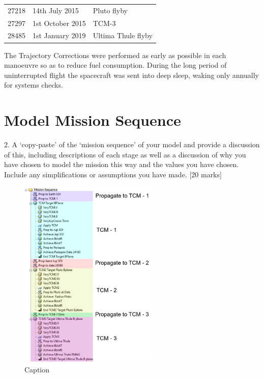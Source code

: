 \documentclass[11pt]{article}
\begin{document}
\begin{table}[H]
\begin{tabular}{@{}cll@{}}
\rowcolor[HTML]{FFD8AD} 
27218                                                          & 14th July 2015                                                                                            & Pluto flyby                                       \\
\rowcolor[HTML]{FFD8AD} 
27297                                                          & 1st October 2015                                                                                          & TCM-3                                             \\
\rowcolor[HTML]{FFB3B3} 
28485                                                          & 1st January 2019                                                                                          & Ultima Thule flyby                                     \\ \bottomrule
\end{tabular}
\label{tab:timeline}
\end{table}

The Trajectory Corrections were performed as early as possible in each manoeuvre so as to reduce fuel consumption.
During the long period of uninterrupted flight the spacecraft was sent into deep sleep, waking only annually for systems checks.


\section{Model Mission Sequence}
2. A ‘copy-paste’ of the ‘mission sequence’ of your model and provide a discussion of this,
including descriptions of each stage as well as a discussion of why you have chosen to
model the mission this way and the values you have chosen. Include any simplifications
or assumptions you have made.
[20 marks]\\

\begin{figure}[H]
    \centering
    \includegraphics[width=0.6\textwidth]{Mission.PNG}
    \caption{Caption}
    \label{fig:my_label}
\end{figure}
\end{document}
